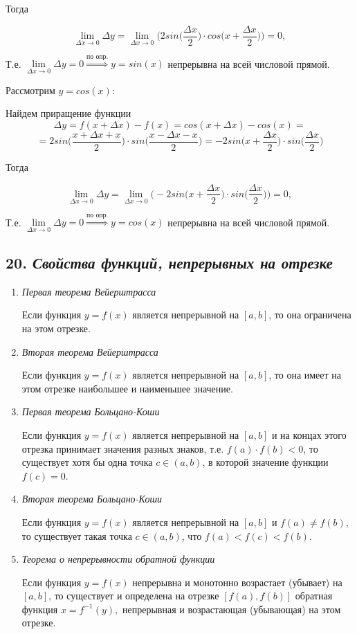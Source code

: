 Тогда

$$
\lim\limits_{\Delta x \to 0}\Delta y = \lim\limits_{\Delta x \to 0}\Bigg(2sin{\Big(}\dfrac{\Delta x}{2}{\Big)}\cdot cos\Big(x + \dfrac{ \Delta x }{2}{\Big)}\Bigg) = 0, 
$$

Т.е. $\lim\limits_{\Delta x \to 0}\Delta y = 0 \overset{\text{по опр.}}\Rightarrow y = sin(x)$ непрерывна на всей числовой прямой.
\vspace*{20pt} 

Рассмотрим $y = cos(x)$:

Найдем приращение функции $$
\Delta y = f(x + \Delta x) - f(x) = cos(x + \Delta x) - cos(x) =
$$ $$
=2sin{\Big(}\dfrac{x + \Delta x + x}{2}{\Big)}\cdot sin\Big(\dfrac{x - \Delta x - x}{2}{\Big)} = -2sin\Big(x + \dfrac{ \Delta x }{2}{\Big)}\cdot sin{\Big(}\dfrac{\Delta x}{2}{\Big)} 
$$

Тогда

$$
\lim\limits_{\Delta x \to 0}\Delta y = \lim\limits_{\Delta x \to 0}\Bigg(-2sin\Big(x + \dfrac{ \Delta x }{2}{\Big)}\cdot sin{\Big(}\dfrac{\Delta x}{2}{\Big)}\Bigg) = 0, 
$$

Т.е. $\lim\limits_{\Delta x \to 0}\Delta y = 0 \overset{\text{по опр.}}\Rightarrow y = cos(x)$ непрерывна на всей числовой прямой.
\newpage 
\subsection*{20. \textit{Свойства функций, непрерывных на отрезке}}
\begin{enumerate}

\item \textit{Первая теорема Вейерштрасса}

Если функция $y = f(x)$ является непрерывной на $[a, b]$, то она ограничена на этом отрезке.
\item \textit{Вторая теорема Вейерштрасса}

Если функция $y = f(x)$ является непрерывной на $[a, b]$, то она имеет на этом отрезке наибольшее и наименьшее значение. %
\item \textit{Первая теорема Больцано-Коши}

Если функция $y = f(x)$ является непрерывной на $[a, b]$ и на концах этого отрезка принимает значения разных знаков, т.е. $f(a)\cdot f(b) < 0$, то существует хотя бы одна точка $c \in (a, b)$, в которой значение функции $f(c) = 0$.
\item \textit{Вторая теорема Больцано-Коши}

Если функция $y = f(x)$ является непрерывной на $[a, b]$ и $f(a)\neq f(b)$, то существует такая точка $c \in (a, b)$, что $f(a) < f(c) < f(b)$.
\item \textit{Теорема о непрерывности обратной функции}

Если функция $y = f(x)$ непрерывна и монотонно возрастает (убывает) на $[a, b]$, то существует и определена на отрезке $[f(a), f(b)]$ обратная функция $x = f^{-1}(y),$ непрерывная и возрастающая (убывающая) на этом отрезке.

\end{enumerate}
\newpage 
